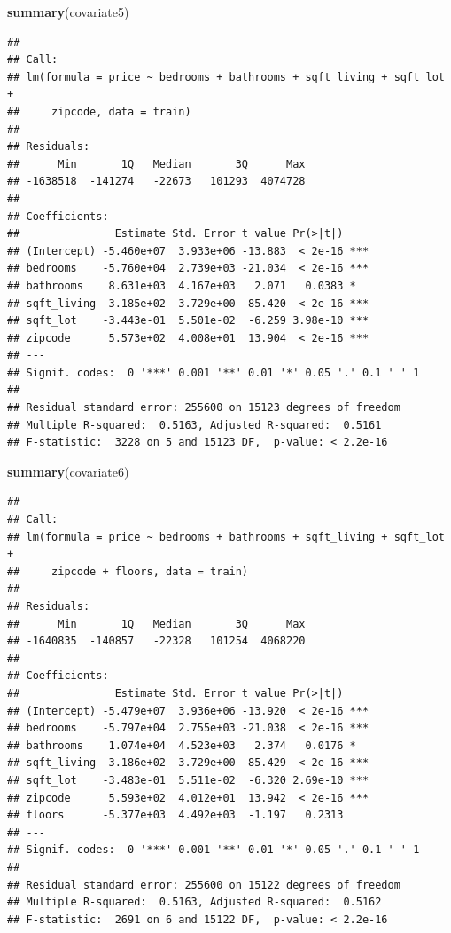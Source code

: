 \documentclass[
]{article}
\newenvironment{Shaded}{\begin{snugshade}}{\end{snugshade}}
\newcommand{\KeywordTok}[1]{\textcolor[rgb]{0.13,0.29,0.53}{\textbf{#1}}}
\newcommand{\NormalTok}[1]{#1}
\begin{document}
\begin{Shaded}
\begin{Highlighting}[]
\KeywordTok{summary}\NormalTok{(covariate5)}
\end{Highlighting}
\end{Shaded}

\begin{verbatim}
## 
## Call:
## lm(formula = price ~ bedrooms + bathrooms + sqft_living + sqft_lot + 
##     zipcode, data = train)
## 
## Residuals:
##      Min       1Q   Median       3Q      Max 
## -1638518  -141274   -22673   101293  4074728 
## 
## Coefficients:
##               Estimate Std. Error t value Pr(>|t|)    
## (Intercept) -5.460e+07  3.933e+06 -13.883  < 2e-16 ***
## bedrooms    -5.760e+04  2.739e+03 -21.034  < 2e-16 ***
## bathrooms    8.631e+03  4.167e+03   2.071   0.0383 *  
## sqft_living  3.185e+02  3.729e+00  85.420  < 2e-16 ***
## sqft_lot    -3.443e-01  5.501e-02  -6.259 3.98e-10 ***
## zipcode      5.573e+02  4.008e+01  13.904  < 2e-16 ***
## ---
## Signif. codes:  0 '***' 0.001 '**' 0.01 '*' 0.05 '.' 0.1 ' ' 1
## 
## Residual standard error: 255600 on 15123 degrees of freedom
## Multiple R-squared:  0.5163, Adjusted R-squared:  0.5161 
## F-statistic:  3228 on 5 and 15123 DF,  p-value: < 2.2e-16
\end{verbatim}

\begin{Shaded}
\begin{Highlighting}[]
\KeywordTok{summary}\NormalTok{(covariate6)}
\end{Highlighting}
\end{Shaded}

\begin{verbatim}
## 
## Call:
## lm(formula = price ~ bedrooms + bathrooms + sqft_living + sqft_lot + 
##     zipcode + floors, data = train)
## 
## Residuals:
##      Min       1Q   Median       3Q      Max 
## -1640835  -140857   -22328   101254  4068220 
## 
## Coefficients:
##               Estimate Std. Error t value Pr(>|t|)    
## (Intercept) -5.479e+07  3.936e+06 -13.920  < 2e-16 ***
## bedrooms    -5.797e+04  2.755e+03 -21.038  < 2e-16 ***
## bathrooms    1.074e+04  4.523e+03   2.374   0.0176 *  
## sqft_living  3.186e+02  3.729e+00  85.429  < 2e-16 ***
## sqft_lot    -3.483e-01  5.511e-02  -6.320 2.69e-10 ***
## zipcode      5.593e+02  4.012e+01  13.942  < 2e-16 ***
## floors      -5.377e+03  4.492e+03  -1.197   0.2313    
## ---
## Signif. codes:  0 '***' 0.001 '**' 0.01 '*' 0.05 '.' 0.1 ' ' 1
## 
## Residual standard error: 255600 on 15122 degrees of freedom
## Multiple R-squared:  0.5163, Adjusted R-squared:  0.5162 
## F-statistic:  2691 on 6 and 15122 DF,  p-value: < 2.2e-16
\end{verbatim}
\end{document}
